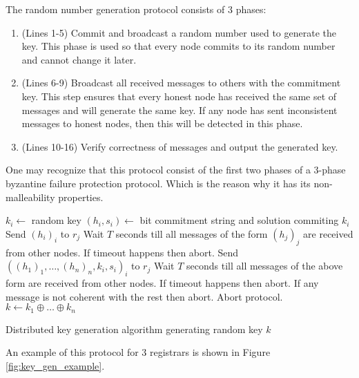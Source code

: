 The random number generation protocol consists of 3 phases:
\begin{enumerate}
  \item (Lines 1-5) Commit and broadcast a random number used to generate the
    key. This phase is used so that every node commits to its random number and
    cannot change it later.
  \item (Lines 6-9) Broadcast all received messages to others with the
    commitment key. This step ensures that every honest node has received the
    same set of messages and will generate the same key. If any node has sent
    inconsistent messages to honest
    nodes, then this will be detected in this phase.
  \item (Lines 10-16) Verify correctness of messages and output the generated
    key.
\end{enumerate}

One may recognize that this protocol consist of the first two phases of a
3-phase byzantine failure protection protocol\cite{cas99}.
Which is the reason why it has its non-malleability properties.

\begin{algorithm}[tb]
  \begin{algorithmic}[1]
  \STATE $k_i \leftarrow $ random key
  \STATE $(h_i, s_i) \leftarrow $ bit commitment string and solution commiting
  $k_i$
    \STATE Send $(h_i)_{i}$ to $r_j$
  \ENDFOR
  \STATE Wait $T$ seconds till all messages of the form $(h_j)_j$ are received
  from other nodes. If timeout happens then abort.
    \STATE Send $\left( (h_1)_1, \ldots, (h_n)_{n}, k_i, s_i\right)_i$ to $r_j$
  \ENDFOR
  \STATE Wait $T$ seconds till all messages of the above form are received
  from other nodes. If timeout happens then abort. If any message is not
  coherent with the rest then abort.
      \STATE Abort protocol.
    \ENDIF
  \ENDFOR
  \STATE $k \leftarrow k_1 \oplus \ldots \oplus k_n$
\end{algorithmic}
  \caption{Distributed key generation algorithm generating random key $k$}
  \label{alg:key_gen_alg}
\end{algorithm}

An example of this protocol for 3 registrars is shown in Figure
\ref{fig:key_gen_example}.

